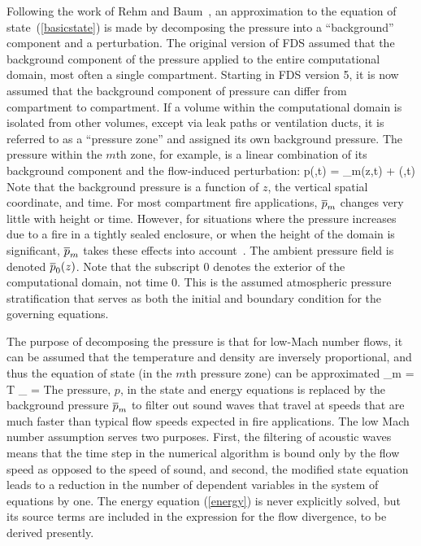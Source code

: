 \documentclass[11pt]{book}
\begin{document}
Following the work of Rehm and Baum~\cite{Rehm:1}, an approximation to the equation of state~(\ref{basicstate}) is made by decomposing the pressure
into a ``background'' component and a perturbation. The original version of FDS assumed that the background component of the pressure
applied to the entire computational domain, most often a single compartment. Starting in FDS version 5, it is now assumed that
the background component of pressure can differ from compartment to compartment. If
a volume within the computational domain is isolated from other volumes, except via leak paths or ventilation ducts, it is referred to as a ``pressure
zone'' and assigned its own background pressure. The pressure within the $m$th zone, for example, is a linear combination
of its background component and the flow-induced perturbation:
\be p(\bx,t) = \bp_m(z,t) + \tp(\bx,t) \ee
Note that the background pressure is a function of $z$, the vertical spatial coordinate, and time. For most
compartment fire applications, $\overline{p}_m$ changes very little with height or time. However, for situations where the pressure
increases due to a fire in a tightly sealed enclosure, or when the height of the domain is significant, $\overline{p}_m$ takes these effects into
account~\cite{Baum:5}. The ambient pressure field is denoted $\overline{p}_0(z)$. Note that the subscript 0 denotes the exterior of the computational domain, not
time 0. This is the assumed atmospheric pressure stratification that serves as both
the initial and boundary condition for the governing equations.

The purpose of decomposing the pressure is that for low-Mach number flows, it can be assumed that the temperature and density are inversely
proportional, and thus the equation of state (in the $m$th pressure zone) can be approximated
\be \bp_m  =  \rho T \R \sum_\alpha {} =   \label{state} \ee
The pressure, $p$, in the state and energy equations is replaced by the background pressure $\overline{p}_m$ to filter out sound waves
that travel at speeds that are much faster
than typical flow speeds expected in fire applications. The low Mach number assumption serves two purposes. First, the filtering of acoustic waves
means that the time step in the numerical algorithm is bound only by the flow speed as opposed to the speed of sound, and second, the modified state
equation leads to a reduction in the number of dependent variables in the system of equations by one. The energy equation (\ref{energy}) is never
explicitly solved, but its source terms are included in the expression for the flow divergence, to be derived presently.
\end{document}
